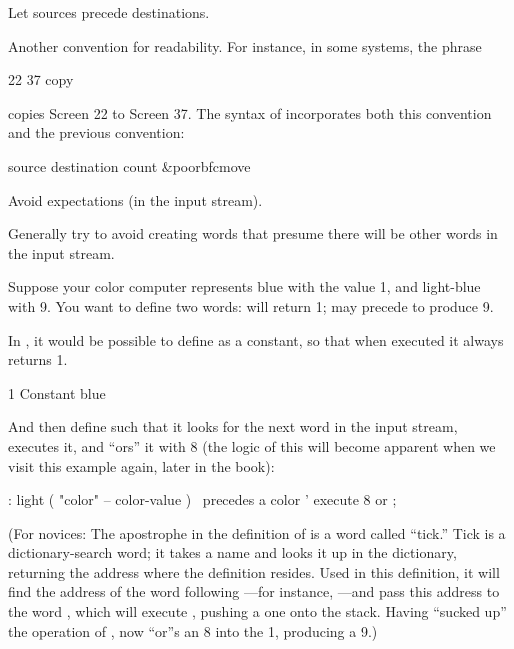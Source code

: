 \begin{tip}
Let sources precede destinations.
\end{tip}
Another convention for readability. For instance, in some systems, the
phrase
\begin{Code}
22 37 copy
\end{Code}
copies Screen 22 to Screen 37. The syntax of  incorporates both
this convention and the previous convention:
\begin{Code}[commandchars=\&\{\}]
source destination count &poorbf{cmove}
\end{Code}

\begin{tip}
Avoid expectations (in the input stream).
\end{tip}
Generally try to avoid creating words that presume there will be other
words in the input stream.

Suppose your color computer represents blue with the value 1, and
light-blue with 9. You want to define two words:  will return
1;  may precede  to produce 9.

In \Forth{}, it would be possible to define  as a constant, so
that when executed it always returns 1.

\begin{Code}
1 Constant blue
\end{Code}
And then define  such that it looks for the next word in the
input stream, executes it, and ``ors'' it with 8 (the logic of this will
become apparent when we visit this example again, later in the book):
\begin{Code}
: light  ( "color" -- color-value )  \ precedes a color
     ' execute  8 or ;
\end{Code}
\noindent (For novices: The apostrophe in the definition of 
is a \Forth{} word called ``tick.'' Tick is a dictionary-search word; it
takes a name and looks it up in the dictionary, returning the address
where the definition resides. Used in this definition, it will find the
address of the word following ---for instance,
---and pass this address to the word , which
will execute , pushing a one onto the stack.  Having ``sucked
up'' the operation of ,  now ``or''s an 8 into
the 1, producing a 9.)


